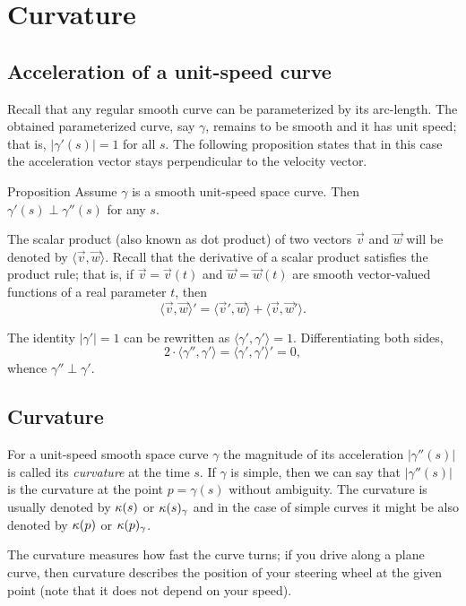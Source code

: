 \chapter{Curvature}

\section{Acceleration of a unit-speed curve}

Recall that any regular smooth curve can be parameterized by its arc-length.
The obtained parameterized curve, say $\gamma$, remains to be smooth and it has unit speed; 
that is, $|\gamma'(s)|=1$ for all $s$.
The following proposition states that in this case
the acceleration vector stays perpendicular to the velocity vector.

\begin{thm}{Proposition}\label{prop:a'-pertp-a''}
Assume $\gamma$ is a smooth unit-speed space curve.
Then $\gamma'(s)\perp \gamma''(s)$ for any $s$.
\end{thm}

The scalar product (also known as dot product) of two vectors $\vec v$ and $\vec w$ will be denoted by $\langle \vec v,\vec w\rangle$.
Recall that the derivative of a scalar product satisfies the product rule;
that is, if $\vec v=\vec v(t)$ and $\vec w=\vec w(t)$ are smooth vector-valued functions of a real parameter $t$, then
\[\langle \vec v,\vec w\rangle'=\langle \vec v',\vec w\rangle+\langle \vec v,\vec w'\rangle.\]

The identity $|\gamma'|=1$ can be rewritten as $\langle\gamma',\gamma'\rangle=1$.
Differentiating both sides, 
\[2\cdot\langle\gamma'',\gamma'\rangle=\langle\gamma',\gamma'\rangle'=0,\]
whence $\gamma''\perp\gamma'$.
\qeds

\section{Curvature}\label{sec:curvature}

For a unit-speed smooth space curve $\gamma$ the magnitude of its acceleration $|\gamma''(s)|$ is called its \emph{curvature} at the time $s$.
If $\gamma$ is simple, then we can say that $|\gamma''(s)|$ is the curvature at the point $p=\gamma(s)$ without ambiguity.
The curvature is usually denoted by $\kappa(s)$ or $\kappa(s)_\gamma$ and in the case of simple curves it might be also denoted by $\kappa(p)$ or $\kappa(p)_\gamma$.

The curvature measures how fast the curve turns;
if you drive along a plane curve, then curvature describes the position of your steering wheel at the given point (note that it does not depend on your speed).

